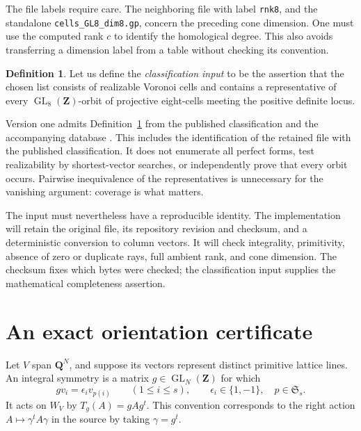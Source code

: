 \documentclass[11pt,a4paper]{article}
\numberwithin{equation}{section}
\theoremstyle{definition}
\newtheorem{definition}[proposition]{Definition}
\theoremstyle{remark}
\newcommand{\Z}{\mathbf Z}
\newcommand{\Q}{\mathbf Q}
\newcommand{\GL}{\operatorname{GL}}
\begin{document}
The file labels require care. The neighboring file with label
\texttt{rnk8}, and the standalone \texttt{cells\_GL8\_dim8.gp}, concern
the preceding cone dimension. One must use the computed rank \(c\)
to identify the homological degree. This also avoids transferring
a dimension label from a table without checking its convention.

\begin{definition}\label{def:admission}
Let us define the \emph{classification input} to be the assertion that
the chosen list consists of realizable Voronoi cells and contains a
representative of every \(\GL_8(\Z)\)-orbit of projective eight-cells
meeting the positive definite locus.
\end{definition}

Version one admits Definition~\ref{def:admission} from the published
classification \cite[\S\S3--4]{DEKM} and the accompanying database
\cite{Data}. This includes the identification of the retained file
with the published classification. It does not enumerate all perfect forms,
test realizability by shortest-vector searches, or independently prove
that every orbit occurs. Pairwise inequivalence of the representatives
is unnecessary for the vanishing argument: coverage is what matters.

The input must nevertheless have a reproducible identity.
The implementation will retain the original file, its repository
revision and checksum, and a deterministic conversion to column
vectors. It will check integrality, primitivity, absence of zero or
duplicate rays, full ambient rank, and cone dimension.
The checksum fixes which bytes were checked; the classification input
supplies the mathematical completeness assertion.

\section{An exact orientation certificate}\label{sec:orientation}

Let \(V\) span \(\Q^N\), and suppose its vectors represent distinct
primitive lattice lines. An integral symmetry is a matrix
\(g\in\GL_N(\Z)\) for which
\begin{equation}\label{eq:signed}
 g v_i=\epsilon_i v_{p(i)}
 \qquad(1\leq i\leq s),
 \qquad \epsilon_i\in\{1,-1\},\quad p\in\mathfrak S_s.
\end{equation}
It acts on \(W_V\) by \(T_g(A)=gAg^t\).
This convention corresponds to the right action
\(A\mapsto\gamma^tA\gamma\) in the source by taking \(\gamma=g^t\).
\end{document}
